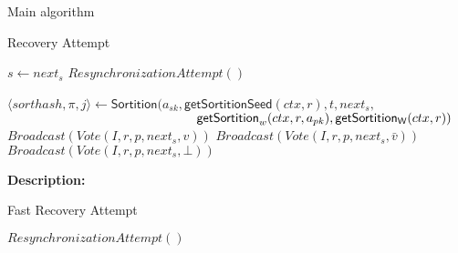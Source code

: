\documentclass[10pt,a4paper]{article}
\begin{document}
\begin{section}{Main algorithm}
\begin{subsection}{Recovery Attempt}
\begin{algorithm}[H]
\begin{algorithmic}[1]
        \State $s \gets next_s$
        \State $ResynchronizationAttempt()$
    
            \State $\langle sorthash, \pi, j\rangle\gets 
            \mathsf{Sortition}(
            a_{sk}, 
            \mathsf{getSortitionSeed}(ctx, r), 
            t, 
            next_s, $ \newline
            ${}$ ${\hskip 5.2cm}\mathsf{getSortition}_w(ctx, r, a_{pk}), 
            \mathsf{getSortition_W}(ctx, r)
            )$
                    \State $Broadcast(Vote(I, r, p, next_s, v))$
                    \State $Broadcast(Vote(I, r, p, next_s, \bar{v}))$
                \Else
                    \State $Broadcast(Vote(I, r, p, next_s, \bot))$
                \EndIf
            \EndIf    
        \EndFor


        \EndFunction
        \end{algorithmic}
        \caption{\underline{Recovery}}
    \end{algorithm}
    
    
    \noindent \textbf{Description:}\\
    
\end{subsection}


\begin{subsection}{Fast Recovery Attempt}\label{ssect:FastRecovery}

    \begin{algorithm}[H]
        \begin{algorithmic}[1]

        \State $ResynchronizationAttempt()$
    

\end{algorithmic}
\end{algorithm}
\end{subsection}
\end{section}
\end{document}
